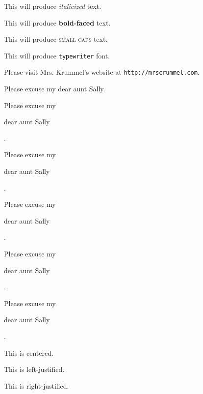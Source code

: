 \documentclass[11pt]{article}
\begin{document}
This will produce \textit{italicized} text.

This will produce \textbf{bold-faced} text.

This will produce \textsc{small caps} text.

This will produce \texttt{typewriter} font.

Please visit Mrs. Krummel's website at \texttt{http://mrscrummel.com}.

Please excuse my dear aunt Sally.

Please excuse my \begin{large}dear aunt Sally\end{large}.

Please excuse my \begin{Large}dear aunt Sally\end{Large}.

Please excuse my \begin{Huge}dear aunt Sally\end{Huge}.

Please excuse my \begin{small}dear aunt Sally\end{small}.

Please excuse my \begin{tiny}dear aunt Sally\end{tiny}.

\begin{center}This is centered.\end{center}

\begin{flushleft}This is left-justified.\end{flushleft}

\begin{flushright}This is right-justified.\end{flushright}
\end{document}
